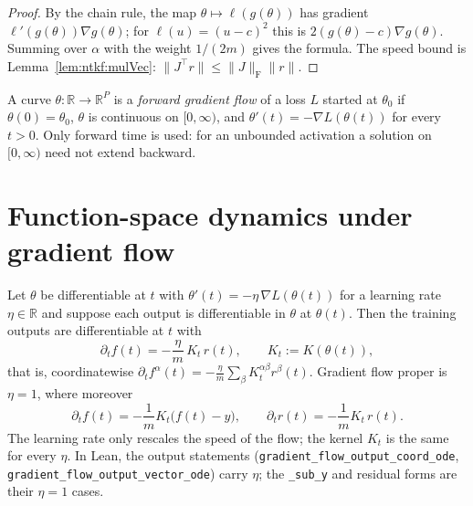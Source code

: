 \begin{proof}
  \leanok
By the chain rule, the map $\theta\mapsto\ell(g(\theta))$ has gradient $\ell'(g(\theta))\nabla g(\theta)$; for
$\ell(u)=(u-c)^2$ this is $2(g(\theta)-c)\nabla g(\theta)$. Summing over $\alpha$ with the weight $1/(2m)$ gives
the formula. The speed bound is Lemma~\ref{lem:ntkf:mulVec}: $\|J^\top r\|\le\|J\|_{\mathrm F}\|r\|$.
\end{proof}

\begin{definition}\label{def:ntkgf:forwardGF}
  \leanok
A curve $\theta:\mathbb R\to\mathbb R^P$ is a \emph{forward gradient flow} of a loss $L$ started at $\theta_0$ if
$\theta(0)=\theta_0$, $\theta$ is continuous on $[0,\infty)$, and
$\theta'(t)=-\nabla L(\theta(t))$ for every $t>0$. Only forward time is used: for an unbounded activation a
solution on $[0,\infty)$ need not extend backward.
\end{definition}


\section{Function-space dynamics under gradient flow}\label{sec:ntkgf:dynamics}

\begin{theorem}\label{thm:ntkgf:outputODE}
  \leanok
Let $\theta$ be differentiable at $t$ with $\theta'(t)=-\eta\,\nabla L(\theta(t))$ for a learning rate $\eta\in\mathbb R$ and suppose each output is differentiable in
$\theta$ at $\theta(t)$. Then the training outputs are differentiable at $t$ with
\[
  \partial_tf(t)=-\frac\eta m\,K_t\,r(t),\qquad K_t:=K(\theta(t)),
\]
that is, coordinatewise $\partial_tf^\alpha(t)=-\frac\eta m\sum_\beta K_t^{\alpha\beta}r^\beta(t)$. Gradient flow proper is $\eta=1$, where moreover
\[
  \partial_tf(t)=-\frac1mK_t\bigl(f(t)-y\bigr),\qquad
  \partial_tr(t)=-\frac1mK_t\,r(t).
\]
The learning rate only rescales the speed of the flow; the kernel $K_t$ is the same for every $\eta$. In Lean, the output statements (\texttt{gradient\_flow\_output\_coord\_ode}, \texttt{gradient\_flow\_output\_vector\_ode}) carry $\eta$; the \texttt{\_sub\_y} and residual forms are their $\eta=1$ cases.
\end{theorem}

